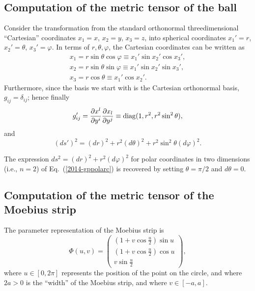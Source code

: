 {\subsection*{Computation of the metric tensor of the ball}
Consider the transformation from the standard orthonormal
threedimensional ``Cartesian'' coordinates
$x_1=x$,
$x_2=y$,
$x_3=z$,
into spherical coordinates
$x_1'=r$,
$x_2'=\theta$,
$x_3'=\varphi$.
In terms of  $r,\theta , \varphi$, the Cartesian coordinates can be written as
\begin{equation}
\begin{split}
 x_1=r \sin \theta \cos \varphi \equiv x_1' \sin x_2' \cos x_3'  , \\
 x_2=r \sin \theta \sin \varphi \equiv x_1'\sin x_2' \sin x_3'  ,    \\
 x_3=r \cos \theta  \equiv x_1'\cos x_2'  .
\end{split}
\end{equation}
Furthermore,  since the basis we start with is the Cartesian orthonormal basis,
$g_{ij}=\delta_{ij}$; hence finally
\begin{equation}
g'_{ij}= {\partial {x}^l\over \partial { y }^i}{\partial {x}_l\over \partial { y }^j}
\equiv {\rm diag}(1,r^2,r^2\sin^2 \theta ),
\end{equation}
and
\begin{equation}
(ds')^2 =(dr)^2+r^2(d\theta )^2+r^2\sin^2 \theta (d\varphi )^2.
\end{equation}

The expression $ds^2 =(dr)^2+r^2(d\varphi )^2$
for polar coordinates in two dimensions (i.e., $n=2$) of Eq.~(\ref{2014-gppolarc})  is recovered by setting $\theta = \pi/2 $ and $d\theta =0$.

\subsection*{Computation of the metric tensor of the Moebius strip}
The parameter representation of the Moebius strip is
\begin{equation}
\Phi (u,v) =\left(
\begin{array}{c}
(1+v\cos \frac{u}{2})\sin u \\
(1+v\cos \frac{u}{2})\cos u \\
v\sin \frac{u}{2}
\end{array}
\right),
\end{equation}
where
$u\in [0,2\pi ]$ represents the position of the point on the circle,  and where $2a>0$ is the ``width'' of the Moebius strip,
and where $v\in [-a,a]$.


}
